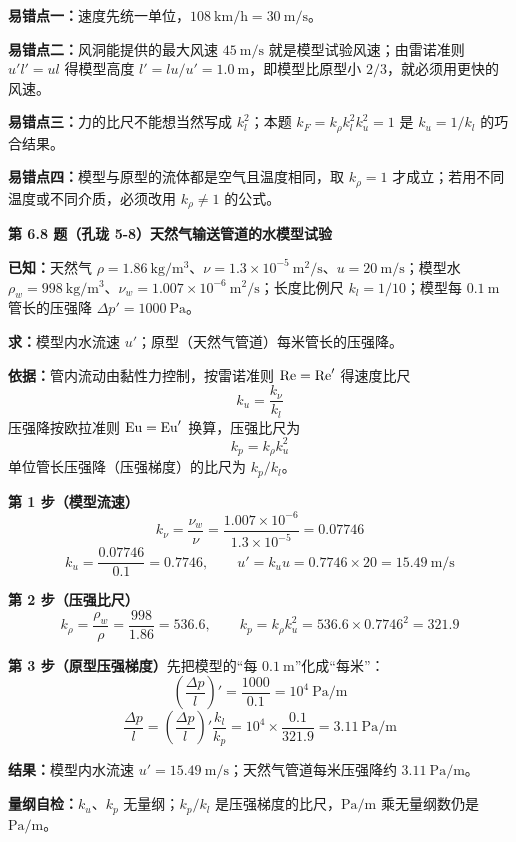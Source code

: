 \begin{yicuo}
\textbf{易错点一：}速度先统一单位，$108\ \mathrm{km/h}=30\ \mathrm{m/s}$。

\textbf{易错点二：}风洞能提供的最大风速 $45\ \mathrm{m/s}$ 就是模型试验风速；由雷诺准则 $u'l'=ul$ 得模型高度 $l'=lu/u'=1.0\ \mathrm{m}$，即模型比原型小 $2/3$，就必须用更快的风速。

\textbf{易错点三：}力的比尺不能想当然写成 $k_l^{2}$；本题 $k_F=k_\rho k_l^{2}k_u^{2}=1$ 是 $k_u=1/k_l$ 的巧合结果。

\textbf{易错点四：}模型与原型的流体都是空气且温度相同，取 $k_\rho=1$ 才成立；若用不同温度或不同介质，必须改用 $k_\rho\ne1$ 的公式。
\end{yicuo}

\noindent\textbf{第 6.8 题（孔珑 5-8）\quad 天然气输送管道的水模型试验}

\begin{jie}
\textbf{已知：}天然气 $\rho=1.86\ \mathrm{kg/m^3}$、$\nu=1.3\times10^{-5}\ \mathrm{m^2/s}$、$u=20\ \mathrm{m/s}$；模型水 $\rho_w=998\ \mathrm{kg/m^3}$、$\nu_w=1.007\times10^{-6}\ \mathrm{m^2/s}$；长度比例尺 $k_l=1/10$；模型每 $0.1\ \mathrm{m}$ 管长的压强降 $\Delta p'=1000\ \mathrm{Pa}$。

\textbf{求：}模型内水流速 $u'$；原型（天然气管道）每米管长的压强降。

\textbf{依据：}管内流动由黏性力控制，按雷诺准则 $\mathrm{Re}=\mathrm{Re}'$ 得速度比尺
\[k_u=\frac{k_\nu}{k_l}\]
压强降按欧拉准则 $\mathrm{Eu}=\mathrm{Eu}'$ 换算，压强比尺为
\[k_p=k_\rho k_u^{2}\]
单位管长压强降（压强梯度）的比尺为 $k_p/k_l$。

\textbf{第 1 步（模型流速）}\quad
\[k_\nu=\frac{\nu_w}{\nu}=\frac{1.007\times10^{-6}}{1.3\times10^{-5}}=0.07746\]
\[k_u=\frac{0.07746}{0.1}=0.7746,\qquad u'=k_uu=0.7746\times20=15.49\ \mathrm{m/s}\]

\textbf{第 2 步（压强比尺）}\quad
\[k_\rho=\frac{\rho_w}{\rho}=\frac{998}{1.86}=536.6,\qquad k_p=k_\rho k_u^{2}=536.6\times0.7746^{2}=321.9\]

\textbf{第 3 步（原型压强梯度）}\quad 先把模型的“每 $0.1\ \mathrm{m}$”化成“每米”：
\[\left(\frac{\Delta p}{l}\right)'=\frac{1000}{0.1}=10^{4}\ \mathrm{Pa/m}\]
\[\frac{\Delta p}{l}=\left(\frac{\Delta p}{l}\right)'\frac{k_l}{k_p}=10^{4}\times\frac{0.1}{321.9}=3.11\ \mathrm{Pa/m}\]

\textbf{结果：}模型内水流速 $u'=15.49\ \mathrm{m/s}$；天然气管道每米压强降约 $3.11\ \mathrm{Pa/m}$。

\textbf{量纲自检：}$k_u$、$k_p$ 无量纲；$k_p/k_l$ 是压强梯度的比尺，$\mathrm{Pa/m}$ 乘无量纲数仍是 $\mathrm{Pa/m}$。
\end{jie}

